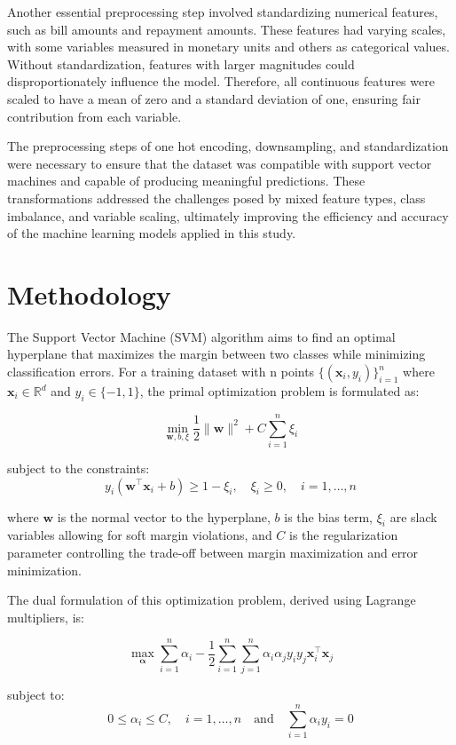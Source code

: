 \documentclass{article}
\begin{document}
Another essential preprocessing step involved standardizing numerical features, such as bill amounts and repayment amounts. These features had varying scales, with some variables measured in monetary units and others as categorical values. 
Without standardization, features with larger magnitudes could disproportionately influence the model. Therefore, all continuous features were scaled to have a mean of zero and a standard deviation of one, ensuring fair contribution from each variable.

The preprocessing steps of one hot encoding, downsampling, and standardization were necessary to ensure that the dataset was compatible with support vector machines and capable of producing meaningful predictions. 
These transformations addressed the challenges posed by mixed feature types, class imbalance, and variable scaling, ultimately improving the efficiency and accuracy of the machine learning models applied in this study.


\section{Methodology}
The Support Vector Machine (SVM) algorithm aims to find an optimal hyperplane that maximizes the margin between two classes while minimizing classification errors. For a training dataset with n points $\{(\mathbf{x}_i, y_i)\}_{i=1}^n$ where $\mathbf{x}_i \in \mathbb{R}^d$ and $y_i \in \{-1, 1\}$, the primal optimization problem is formulated as:

\[
\min_{\mathbf{w}, b, \xi} \frac{1}{2} \|\mathbf{w}\|^2 + C \sum_{i=1}^n \xi_i
\]

subject to the constraints:
\[
y_i(\mathbf{w}^\top\mathbf{x}_i + b) \geq 1 - \xi_i, \quad \xi_i \geq 0, \quad i = 1,\ldots,n
\]

where $\mathbf{w}$ is the normal vector to the hyperplane, $b$ is the bias term, $\xi_i$ are slack variables allowing for soft margin violations, and $C$ is the regularization parameter controlling the trade-off between margin maximization and error minimization.

The dual formulation of this optimization problem, derived using Lagrange multipliers, is:

\[
\max_{\boldsymbol{\alpha}} \sum_{i=1}^n \alpha_i - \frac{1}{2}\sum_{i=1}^n\sum_{j=1}^n \alpha_i\alpha_j y_i y_j \mathbf{x}_i^\top\mathbf{x}_j
\]

subject to:
\[
0 \leq \alpha_i \leq C, \quad i = 1,\ldots,n \quad \text{and} \quad \sum_{i=1}^n \alpha_i y_i = 0
\]
\end{document}
